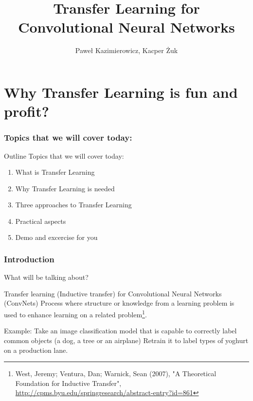 \documentclass[aspectratio=1610,english]{beamer} %
\title{Transfer Learning for Convolutional Neural Networks}
\author{Paweł Kazimierowicz, Kacper Żuk}
\date{}
\institute[AGH]{

}
\begin{document}
  	\maketitle
	\part{Why Transfer Learning is fun and profit?}
	\section{Topics that we will cover today:}
	\begin{frame}{Outline}
		Topics that we will cover today:
		\begin{enumerate}
			\item What is Transfer Learning 
			\item Why Transfer Learning is needed
			\item Three approaches to Transfer Learning
			\item Practical aspects
			\item Demo and excercise for you
		\end{enumerate}
	\end{frame}
	\section{Introduction}
		\begin{frame}{What will be talking about?}
			\begin{block}{Transfer learning (Inductive transfer) for Convolutional Neural Networks (ConvNets)}
				Process where structure or knowledge from a learning problem is used to enhance learning on a related problem\footnote{West, Jeremy; Ventura, Dan; Warnick, Sean (2007), "A Theoretical Foundation for Inductive Transfer", \url{http://cpms.byu.edu/springresearch/abstract-entry?id=861}}. 
			\end{block}
			Example: \newline
			Take an image classification model that is capable to correctly label common objects (a dog, a tree or an airplane)
			Retrain it to label types of yoghurt on a production lane.
		\end{frame}
	
\end{document}
